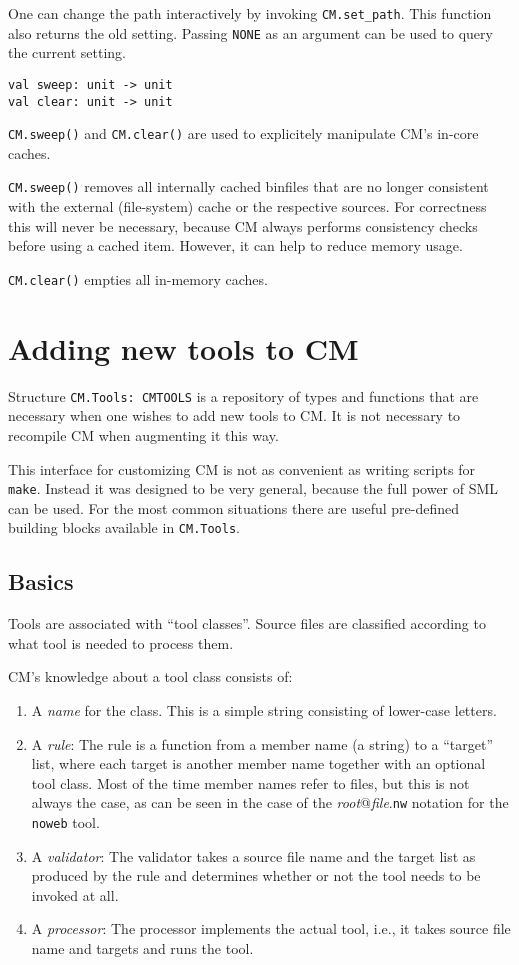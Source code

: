 \documentclass{article}
\begin{document}
One can change the path interactively by invoking \verb|CM.set_path|.
This function also returns the old setting.  Passing {\tt NONE} as an
argument can be used to query the current setting.

\begin{verbatim}
val sweep: unit -> unit
val clear: unit -> unit
\end{verbatim}

{\tt CM.sweep()} and {\tt CM.clear()} are used to explicitely
manipulate CM's in-core caches. 

{\tt CM.sweep()} removes all internally cached binfiles that
are no longer consistent with the external (file-system) cache or the
respective sources.  For correctness this will never be necessary,
because CM always performs consistency checks before using a
cached item.  However, it can help to reduce memory usage.

{\tt CM.clear()} empties all in-memory caches.

\section{Adding new tools to CM}

\label{sec:addtools}

Structure {\tt CM.Tools:~CMTOOLS} is a repository of types and
functions that are necessary when one wishes to add new tools to CM.
It is not necessary to recompile CM when augmenting it this way.

This interface for customizing CM is not as convenient as writing
scripts for {\tt make}. Instead it was designed to be very general,
because the full power of SML can be used.  For the most common
situations there are useful pre-defined building blocks available in
{\tt CM.Tools}.

\subsection{Basics}

Tools are associated with ``tool classes''.  Source files are
classified according to what tool is needed to process them.

CM's knowledge about a tool class consists of:
\begin{enumerate}
\item A {\em name} for the class. This is a simple string consisting
of lower-case letters.
\item A {\em rule}: The rule is a function from a member name (a
string) to a ``target'' list, where each target is another member name
together with an optional tool class. Most of the time member names
refer to files, but this is not always the case, as can be seen in the
case of the {\em root}@{\em file}.{\tt nw} notation for the {\tt
noweb} tool.
\item A {\em validator}: The validator takes a source file name and
the target list as produced by the rule and determines whether or not
the tool needs to be invoked at all.
\item A {\em processor}: The processor implements the actual tool,
i.e., it takes source file name and targets and runs the tool.
\end{enumerate}
\end{document}
